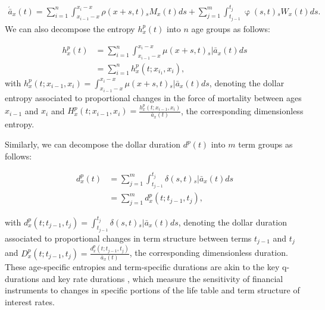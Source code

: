 \documentclass[12pt]{article}
\begin{document}
\begin{equation}\label{eq:TimeDerivAge}
\begin{split}
 \acute{\bar{a}}_x(t) = \sum_{i=1}^n\int_{x_{i-1}-x}^{x_i-x}  \rho(x+s,t) {}_sM_x(t)  ds +\sum_{j=1}^m\int_{t_{j-1}}^{t_j}   \upvarphi(s,t) {}_sW_x(t)  ds.  
\end{split}
\end{equation}
We can also decompose the entropy $h_x^p(t)$ into $n$ age groups as follows:

\begin{equation} \label{eq:EntropyAge}
\begin{split}
{h}^{p}_{x}(t) &=  \sum_{i=1}^n\int_{x_{i-1}-x}^{x_i-x} \mu(x+s,t)   {}_s|\bar{a}_x(t) ds \\
&=  \sum_{i=1}^n {h}^{p}_{x}(t;x_{i_1},x_{i}),
\end{split}
\end{equation}
with ${h}^{p}_{x}(t;x_{i-1},x_{i})=\int_{x_{i-1}-x}^{x_i-x} \mu(x+s,t)   {}_s|\bar{a}_x(t) ds$, denoting the dollar entropy associated to proportional changes in the force of mortality between ages $x_{i-1}$ and $x_{i}$ and ${H}^{p}_{x}(t;x_{i-1},x_{i}) = \frac{{h}^{p}_{x}(t;x_{i-1},x_{i})}{\bar{a}_x(t)}$, the corresponding dimensionless entropy. 

Similarly, we can decompose the dollar duration $d^p(t)$ into $m$ term groups as follows:

\begin{equation}\label{eq:DurationAge}
\begin{split}
{d}^{p}_{x}(t) &= \sum_{j=1}^m\int_{t_{j-1}}^{t_j} \delta(s,t) {}_s|\bar{a}_x(t)ds \\
&= \sum_{j=1}^m {d}^{p}_{x}(t;t_{j-1},t_{j}),
\end{split}
\end{equation}

with ${d}^{p}_{x}(t;t_{j-1},t_{j}) = \int_{t_{j-1}}^{t_j} \delta(s,t) {}_s|\bar{a}_x(t)ds$, denoting the dollar duration associated to proportional changes in term structure between terms $t_{j-1}$ and $t_{j}$ and ${D}^{p}_{x}(t;t_{j-1},t_{j}) = \frac{{d}^{p}_{x}(t;t_{j-1},t_{j})}{\bar{a}_x(t)}$, the corresponding dimensionless duration. These age-specific entropies and term-specific durations are akin to the key q-durations \citep{li2012key} and key rate durations \citep{Ho1992}, which measure the sensitivity of financial instruments to changes in specific portions of the life table and term structure of interest rates.\\
\end{document}
